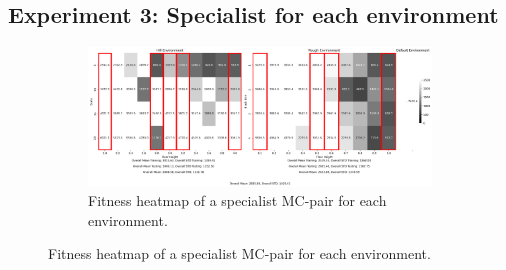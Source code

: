     \subsection{Experiment 3: Specialist for each environment}
        \begin{figure}[!ht]
            \centering
            \begin{subfigure}{\textwidth}
                \centering
                \includegraphics[width=\linewidth]{./resources/specialist_1_2835/fitness_heatmap.png}
                \caption{Fitness heatmap of a specialist MC-pair for each environment.}
                \label{fig:fit_heat_spec}
            \end{subfigure}


\end{figure}
